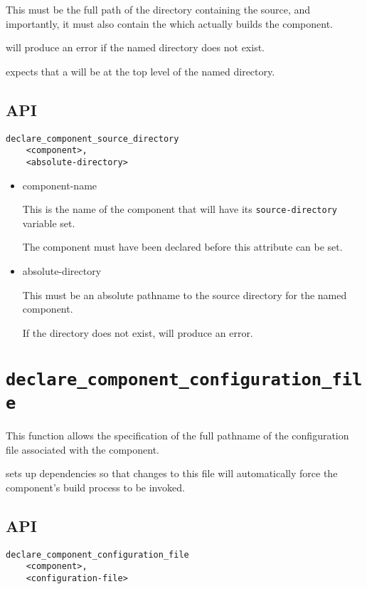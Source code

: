 This must be the full path of the directory containing the source, and
importantly, it must also contain the \makefile which actually builds
the component.

\lmsbw will produce an error if the named directory does not exist.

\lmsbw expects that a \makefile will be at the top level of the named
directory.

\subsection{API}

\begin{verbatim}
declare_component_source_directory
    <component>,
    <absolute-directory>
\end{verbatim}

\begin{itemize}
\item component-name

  This is the name of the component that will have its
  \texttt{source-directory} variable set.

  The component must have been declared before this attribute can be
  set.

\item absolute-directory

  This must be an absolute pathname to the source directory for the
  named component.

  If the directory does not exist, \lmsbw will produce an error.
\end{itemize}

\section{\texttt{declare\_component\_configuration\_file}}\label{api:configuration-file}

This function allows the specification of the full pathname of the
configuration file associated with the component.

\lmsbw sets up dependencies so that changes to this file will
automatically force the component's build process to be invoked.

\subsection{API}

\begin{verbatim}
declare_component_configuration_file
    <component>,
    <configuration-file>
\end{verbatim}


